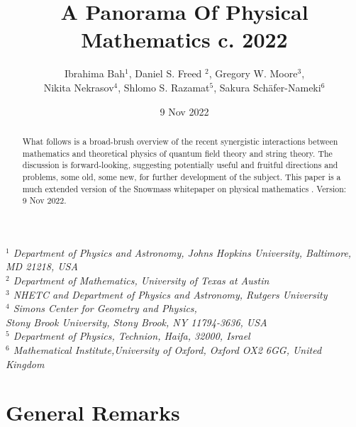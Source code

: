 \documentclass[12pt]{article}
\date{9 Nov 2022}
\title{A Panorama Of Physical Mathematics c. 2022
}
\author{
Ibrahima Bah$^1$, 
Daniel S. Freed $^2$,
Gregory W. Moore$^3$, \\
 Nikita Nekrasov$^4$, 
Shlomo S. Razamat$^5$, 
Sakura Sch\"afer-Nameki$^6$}
\begin{document}
\maketitle



\begin{center}
{\it $^1$  Department of Physics and Astronomy, Johns Hopkins University, Baltimore, MD 21218, USA }\\
{\it $^2$ Department of Mathematics, University of Texas at Austin }\\
{\it $^3$ NHETC and Department of Physics and Astronomy, Rutgers University }\\
{\it $^4$ Simons Center for Geometry and Physics, \\
Stony Brook University, Stony Brook, NY 11794-3636, USA}\\
{\it $^5$ Department of Physics, Technion, Haifa, 32000, Israel}\\
{\it $^6$ Mathematical Institute,University of Oxford, Oxford OX2 6GG, United Kingdom }
\end{center}
\begin{abstract}
 \noindent
 What follows is a broad-brush overview of the 
 recent synergistic interactions 
between mathematics and theoretical physics of quantum 
field theory and string theory. The discussion is forward-looking, 
suggesting potentially useful and fruitful directions and problems, 
some old, some new, for further development of the subject. 
This paper is a much extended version of the Snowmass whitepaper on physical mathematics 
\cite{Bah:2022xfv}.  Version:    9 Nov 2022.
\end{abstract}

\newpage
\tableofcontents
\newpage

\section{General Remarks }

\label{sec:genrem}
\end{document}
